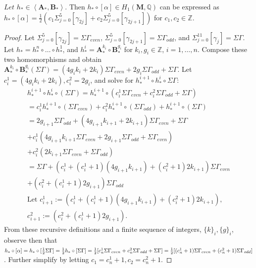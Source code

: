 \documentclass[]{article}
\begin{document}
\begin{lem}
$Let$ $h_*\in \left<\mathbf{A}_*,\mathbf{B}_*\right>. $ Then $h_*\circ[\alpha]\in H_1(\mathbf{M},\mathbb{Q})$ can be expressed as $h_*\circ[\alpha]=\frac{1}{2}(c_1\Sigma^{5}_{j=0}[\gamma_{2j}]+c_2\Sigma^{5}_{j=0}[\gamma_{2j+1}])$ for $c_1,c_2\in\mathbb{Z}$.
\begin{proof}
Let $\Sigma^{5}_{j=0}[\gamma_{2j}]=\Sigma\Gamma_{even}$, $\Sigma^{5}_{j=0}[\gamma_{2j+1}]= \Sigma\Gamma_{odd}$, and  $\Sigma^{11}_{j=0}[\gamma_{j}]= \Sigma\Gamma$. Let $h_*=h_*^n\circ\dots\circ h_ *^1$, and $h_*^{i}=\mathbf{A}_*^{k_i}\circ \mathbf{B}_*^{g_i}$ for $k_i, g_i \in\mathbb{Z}$, $i=1,\dots,n$. Compose these two homomorphisms and obtain $\mathbf{A}_*^{k_i}\circ \mathbf{B}_*^{g_i}(\Sigma\Gamma)=(4g_ik_i+2k_i)\Sigma\Gamma_{even}+2g_i\Sigma\Gamma_{odd}+\Sigma\Gamma$. Let $c_i^1=(4g_ik_i+2k_i), c_i^2=2g_i$, and solve for $h_*^{i+1}\circ h_*^i\circ\Sigma\Gamma$:
\begin{align*}
h_*^{i+1}\circ h_*^{i}\circ(\Sigma\Gamma)=h_*^{i+1}\circ(c_i^1\Sigma\Gamma_{even}+c_i^2\Sigma\Gamma_{odd}+\Sigma\Gamma)\\ =c_i^{1}h_*^{i+1}\circ(\Sigma\Gamma_{even})+c_i^2h_*^{i+1}\circ(\Sigma\Gamma_{odd})+h_*^{i+1}\circ(\Sigma\Gamma)\\ =2g_{i+1}\Sigma\Gamma_{odd}+(4g_{i+1}k_{i+1}+2k_{i+1})\Sigma\Gamma_{even}+\Sigma\Gamma\\+c_i^{1}(4g_{i+1}k_{i+1}\Sigma\Gamma_{even}+2g_{i+1}\Sigma\Gamma_{odd}+\Sigma\Gamma_{even})\\+c_{i}^2(2k_{i+1}\Sigma\Gamma_{even}+\Sigma\Gamma_{odd})\\
=\Sigma\Gamma+(c_i^1+(c_{i}^1+1)(4g_{i+1}k_{i+1})+(c_i^2+1)2k_{i+1})\Sigma\Gamma_{even}\\+(c_i^2+(c_i^1+1)2g_{i+1})\Sigma\Gamma_{odd}\\
\text{Let }c_{i+1}^1:=(c_i^1+(c_{i}^1+1)(4g_{i+1}k_{i+1})+(c_i^2+1)2k_{i+1}),\\
c_{i+1}^2:=(c_i^2+(c_i^1+1)2g_{i+1}).
\end{align*}
From these recursive definitions and a finite sequence of integers, $\{k\}_i,\{g\}_i$, observe then that\\ $h_*\circ[\alpha]=h_*\circ[\frac{1}{2}\Sigma\Gamma]=\frac{1}{2}h_*\circ[\Sigma\Gamma]=\frac{1}{2}[c_n^1\Sigma\Gamma_{even}+c_n^2\Sigma\Gamma_{odd}+\Sigma\Gamma]\\
=\frac{1}{2}[(c_n^1+1)\Sigma\Gamma_{even}+(c_n^2+1)\Sigma\Gamma_{odd}]$. Further simplify by letting $c_1=c_n^1+1,c_2=c_n^2+1$.
\end{proof}
\end{lem}
\end{document}
